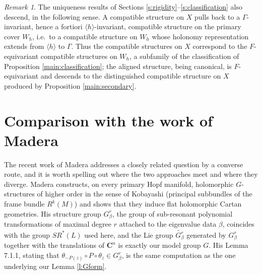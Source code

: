 \documentclass[english,11pt]{amsart}
\theoremstyle{definition}
\theoremstyle{remark}
\newtheorem{remark}[theorem]{Remark}
\numberwithin{equation}{section}
\newcommand{\C}{\mathbf{C}}
\begin{document}
\begin{remark}
The uniqueness results of Sections \ref{s:rigidity}--\ref{s:classification} also descend, in the following sense. A compatible structure on $X$ pulls back to a $\Gamma$-invariant, hence a fortiori $\langle h\rangle$-invariant, compatible structure on the primary cover $W_h$, i.e.\ to a compatible structure on $W_h$ whose holonomy representation extends from $\langle h\rangle$ to $\Gamma$. Thus the compatible structures on $X$ correspond to the $F$-equivariant compatible structures on $W_h$, a subfamily of the classification of Proposition \ref{main:classification}; the aligned structure, being canonical, is $F$-equivariant and descends to the distinguished compatible structure on $X$ produced by Proposition \ref{main:secondary}.
\end{remark}


\section{Comparison with the work of Madera}\label{s:madera}
The recent work of Madera \cite{Madera} addresses a closely related question by a converse route, and it is worth spelling out where the two approaches meet and where they diverge. Madera constructs, on every primary Hopf manifold, holomorphic $G$-structures of higher order in the sense of Kobayashi (principal subbundles of the frame bundle $R^k(M)$) and shows that they induce flat holomorphic Cartan geometries. His structure group $G^r_\beta$, the group of sub-resonant polynomial transformations of maximal degree $r$ attached to the eigenvalue data $\beta$, coincides with the group $SR^*(L)$ used here, and the Lie group $\widetilde{G^r_\beta}$ generated by $G^r_\beta$ together with the translations of $\C^n$ is exactly our model group $G$. His Lemma 7.1.1, stating that $\theta_{-P(z)}\circ P\circ\theta_z\in G^r_\beta$, is the same computation as the one underlying our Lemma \ref{l:Gform}.
\end{document}
